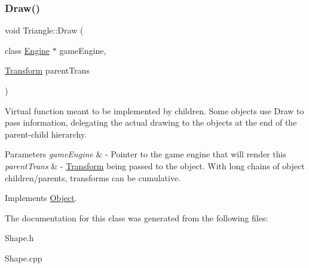\subsubsection{\texorpdfstring{Draw()}{Draw()}}
{\footnotesize\ttfamily void Triangle\+::\+Draw (\begin{DoxyParamCaption}\item[{class \hyperlink{class_engine}{Engine} $\ast$}]{game\+Engine,  }\item[{\hyperlink{class_transform}{Transform}}]{parent\+Trans }\end{DoxyParamCaption})\hspace{0.3cm}{\ttfamily [virtual]}}



Virtual function meant to be implemented by children. Some objects use Draw to pass information, delegating the actual drawing to the objects at the end of the parent-\/child hierarchy. 


\begin{DoxyParams}{Parameters}
{\em game\+Engine} & -\/ Pointer to the game engine that will render this \\
\hline
{\em parent\+Trans} & -\/ \hyperlink{class_transform}{Transform} being passed to the object. With long chains of object children/parents, transforms can be cumulative. \\
\hline
\end{DoxyParams}


Implements \hyperlink{class_object_adeb7a19aaca51dbf093b37fd21c5e41f}{Object}.



The documentation for this class was generated from the following files\+:\begin{DoxyCompactItemize}
\item 
Shape.\+h\item 
Shape.\+cpp\end{DoxyCompactItemize}
